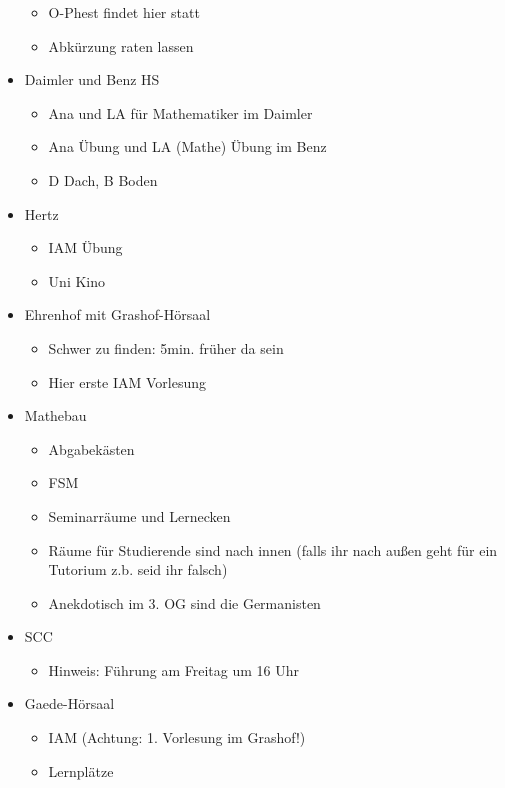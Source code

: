 \documentclass[10pt,ngerman]{scrartcl}
\begin{document}
\begin{multicols}{2}
\begin{itemize}
\begin{itemize}
            \item O-Phest findet hier statt
            \item Abkürzung raten lassen
        \end{itemize}
    \item Daimler und Benz HS
        \begin{itemize}
            \item Ana und LA für Mathematiker im Daimler
            \item Ana Übung und LA (Mathe) Übung im Benz
            \item D Dach, B Boden
        \end{itemize}
    \item Hertz
        \begin{itemize}
            \item IAM Übung
            \item Uni Kino
        \end{itemize}
    \item Ehrenhof mit Grashof-Hörsaal
        \begin{itemize}
            \item Schwer zu finden: 5min. früher da sein
            \item Hier erste IAM Vorlesung
        \end{itemize}
    \item Mathebau
        \begin{itemize}
            \item Abgabekästen
            \item FSM
            \item Seminarräume und Lernecken
            \item Räume für Studierende sind nach innen (falls ihr nach außen geht für
                ein Tutorium z.b. seid ihr falsch)
            \item Anekdotisch im 3. OG sind die Germanisten
        \end{itemize}
    \item SCC
        \begin{itemize}
            \item Hinweis: Führung am Freitag um 16 Uhr
        \end{itemize}
    \item Gaede-Hörsaal
        \begin{itemize}
            \item IAM (Achtung: 1. Vorlesung im Grashof!)
            \item Lernplätze

\end{itemize}
\end{itemize}
\end{multicols}
\end{document}
